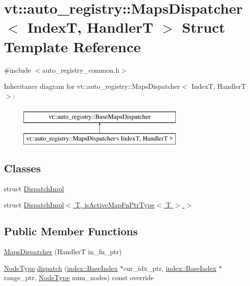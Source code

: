 \hypertarget{structvt_1_1auto__registry_1_1_maps_dispatcher}{}\section{vt\+:\+:auto\+\_\+registry\+:\+:Maps\+Dispatcher$<$ IndexT, HandlerT $>$ Struct Template Reference}
\label{structvt_1_1auto__registry_1_1_maps_dispatcher}


{\ttfamily \#include $<$auto\+\_\+registry\+\_\+common.\+h$>$}

Inheritance diagram for vt\+:\+:auto\+\_\+registry\+:\+:Maps\+Dispatcher$<$ IndexT, HandlerT $>$\+:\begin{figure}[H]
\begin{center}
\leavevmode
\includegraphics[height=2.000000cm]{structvt_1_1auto__registry_1_1_maps_dispatcher}
\end{center}
\end{figure}
\subsection*{Classes}
\begin{DoxyCompactItemize}
\item 
struct \hyperlink{structvt_1_1auto__registry_1_1_maps_dispatcher_1_1_dispatch_impl}{Dispatch\+Impl}
\item 
struct \hyperlink{structvt_1_1auto__registry_1_1_maps_dispatcher_1_1_dispatch_impl_3_01_t_00_01is_active_map_fn_ptr_type_3_01_t_01_4_01_4}{Dispatch\+Impl$<$ T, is\+Active\+Map\+Fn\+Ptr\+Type$<$ T $>$ $>$}
\end{DoxyCompactItemize}
\subsection*{Public Member Functions}
\begin{DoxyCompactItemize}
\item 
\hyperlink{structvt_1_1auto__registry_1_1_maps_dispatcher_a0b5b1f1c83950b157b243e5e095261b3}{Maps\+Dispatcher} (HandlerT in\+\_\+fn\+\_\+ptr)
\item 
\hyperlink{namespacevt_a866da9d0efc19c0a1ce79e9e492f47e2}{Node\+Type} \hyperlink{structvt_1_1auto__registry_1_1_maps_dispatcher_ac4fa2a94e5f3969bf09a7402c4469f0c}{dispatch} (\hyperlink{structvt_1_1index_1_1_base_index}{index\+::\+Base\+Index} $\ast$cur\+\_\+idx\+\_\+ptr, \hyperlink{structvt_1_1index_1_1_base_index}{index\+::\+Base\+Index} $\ast$range\+\_\+ptr, \hyperlink{namespacevt_a866da9d0efc19c0a1ce79e9e492f47e2}{Node\+Type} num\+\_\+nodes) const override
\end{DoxyCompactItemize}
